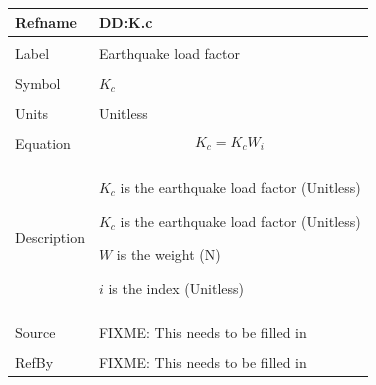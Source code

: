 \documentclass[12pt]{article}
\begin{document}
\noindent \begin{minipage}{\textwidth}
\begin{tabular}{p{} p{}}
\toprule \textbf{Refname} & \textbf{DD:K.c}
\label{DD:K.c}
\\ \midrule \\
Label & Earthquake load factor
\\ \midrule \\
Symbol & ${K_{c}}$
\\ \midrule \\
Units & Unitless
\\ \midrule \\
Equation & \begin{dmath}
           {K_{c}}={K_{c}} W_{i}
           \end{dmath}
\\ \midrule \\
Description & \begin{symbDescription}
              \item{${K_{c}}$ is the earthquake load factor (Unitless)}
              \item{${K_{c}}$ is the earthquake load factor (Unitless)}
              \item{$W$ is the weight (N)}
              \item{$i$ is the index (Unitless)}
              \end{symbDescription}
\\ \midrule \\
Source & FIXME: This needs to be filled in
\\ \midrule \\
RefBy & FIXME: This needs to be filled in
\\ \bottomrule \end{tabular}
\end{minipage}\\
~\newline
\end{document}
